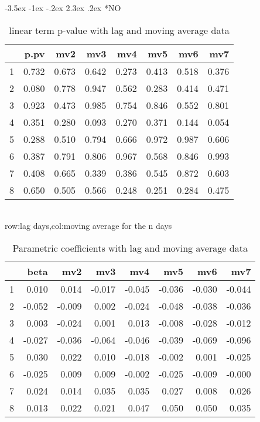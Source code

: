 \documentclass[a4paper, 12pt]{article}
\makeatletter
\def\large{\fontsize{14}{20}\selectfont}
\renewcommand\subsection{\@startsection {subsection}{1}{\z@}%
                                   {-3.5ex \@plus -1ex \@minus -.2ex}%
                                   {2.3ex \@plus.2ex}%
                                   {\centering\normalfont\large\bfseries}}
\makeatother
\begin{document}
\subsection*{NO}
\begin{table}[h]
\centering
\caption{linear term p-value with lag and moving average data}
\begin{tabular}{rrrrrrrr}
  \hline
 & p.pv & mv2 & mv3 & mv4 & mv5 & mv6 & mv7 \\
  \hline
1 & 0.732 & 0.673 & 0.642 & 0.273 & 0.413 & 0.518 & 0.376 \\
  2 & 0.080 & 0.778 & 0.947 & 0.562 & 0.283 & 0.414 & 0.471 \\
  3 & 0.923 & 0.473 & 0.985 & 0.754 & 0.846 & 0.552 & 0.801 \\
  4 & 0.351 & 0.280 & 0.093 & 0.270 & 0.371 & 0.144 & 0.054 \\
  5 & 0.288 & 0.510 & 0.794 & 0.666 & 0.972 & 0.987 & 0.606 \\
  6 & 0.387 & 0.791 & 0.806 & 0.967 & 0.568 & 0.846 & 0.993 \\
  7 & 0.408 & 0.665 & 0.339 & 0.386 & 0.545 & 0.872 & 0.603 \\
  8 & 0.650 & 0.505 & 0.566 & 0.248 & 0.251 & 0.284 & 0.475 \\
   \hline
\end{tabular}
\\row:lag days,col:moving average for the n days
\end{table}

\begin{table}[h]
\centering
\caption{Parametric coefficients with lag and moving average data}
\begin{tabular}{rrrrrrrr}
  \hline
 & beta & mv2 & mv3 & mv4 & mv5 & mv6 & mv7 \\
  \hline
1 & 0.010 & 0.014 & -0.017 & -0.045 & -0.036 & -0.030 & -0.044 \\
  2 & -0.052 & -0.009 & 0.002 & -0.024 & -0.048 & -0.038 & -0.036 \\
  3 & 0.003 & -0.024 & 0.001 & 0.013 & -0.008 & -0.028 & -0.012 \\
  4 & -0.027 & -0.036 & -0.064 & -0.046 & -0.039 & -0.069 & -0.096 \\
  5 & 0.030 & 0.022 & 0.010 & -0.018 & -0.002 & 0.001 & -0.025 \\
  6 & -0.025 & 0.009 & 0.009 & -0.002 & -0.025 & -0.009 & -0.000 \\
  7 & 0.024 & 0.014 & 0.035 & 0.035 & 0.027 & 0.008 & 0.026 \\
  8 & 0.013 & 0.022 & 0.021 & 0.047 & 0.050 & 0.050 & 0.035 \\
   \hline
\end{tabular}
\end{table}
\clearpage
\end{document}
